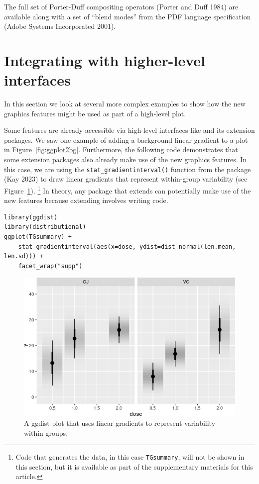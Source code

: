 The full set of Porter-Duff compositing operators (Porter and Duff 1984)
are available along with a set of ``blend modes'' from
the PDF language specification (Adobe Systems Incorporated 2001).

\hypertarget{integration}{%
\section{Integrating with higher-level interfaces}\label{integration}}

In this section we look at several more complex
examples to show how the new graphics features might be
used as part of a high-level plot.

Some features are already accessible via high-level interfaces like
 and its extension packages. We saw one example of
adding a background linear gradient to a  plot
in Figure~\ref{fig:ggplot2bg}.
Furthermore, the following code demonstrates that some  extension
packages also already make use of the new graphics features. In this case,
we are using the \texttt{stat\_gradientinterval()} function from the
 package (Kay 2023)
to draw linear gradients that represent within-group variability
(see Figure~\ref{fig:ggdist}).
\footnote{Code that generates the data, in this case \texttt{TGsummary}, will not be
  shown in this section, but it is available as part of the supplementary
  materials for this article.}
In theory, any package that extends  can potentially
make use of the
new features because extending  involves writing
 code.

\begin{verbatim}
library(ggdist)
library(distributional)
ggplot(TGsummary) +
    stat_gradientinterval(aes(x=dose, ydist=dist_normal(len.mean, len.sd))) +
    facet_wrap("supp")
\end{verbatim}

\begin{figure}[h]
\includegraphics[width=1\linewidth]{murrell-definitions-2023_files/figure-latex/ggdist-1} \caption{A ggdist plot that uses linear gradients to represent variability within groups.}\label{fig:ggdist}
\end{figure}

